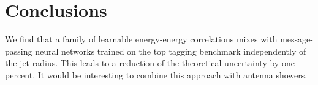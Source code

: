 \section{Conclusions}\label{sec:conclusions}

We find that a family of learnable energy-energy correlations mixes with
message-passing neural networks trained on the top tagging benchmark
independently of the jet radius. This leads to a reduction of the
theoretical uncertainty by one percent. It would be interesting to
combine this approach with antenna showers.

